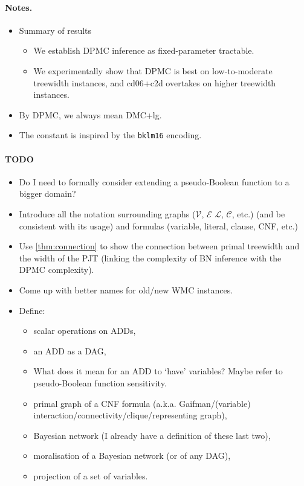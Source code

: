 \documentclass{article}
\theoremstyle{definition}
\theoremstyle{remark}
\begin{document}
\paragraph{Notes.}
\begin{itemize}
\item Summary of results
  \begin{itemize}
  \item We establish \textsc{DPMC} inference as fixed-parameter tractable.
  \item We experimentally show that \textsc{DPMC} is best on low-to-moderate
    treewidth instances, and cd06+c2d overtakes on higher treewidth instances.
  \end{itemize}
\item By \textsc{DPMC}, we always mean DMC+lg.
\item The constant is inspired by the \texttt{bklm16} encoding.
\end{itemize}

\paragraph{TODO}
\begin{itemize}
\item Do I need to formally consider extending a pseudo-Boolean function to a
  bigger domain?
\item Introduce all the notation surrounding graphs ($\mathcal{V}$,
  $\mathcal{E}$ $\mathcal{L}$, $\mathcal{C}$, etc.) (and be consistent with its
  usage) and formulas (variable, literal, clause, CNF, etc.)
\item Use \cref{thm:connection} to show the connection between primal treewidth
  and the width of the PJT (linking the complexity of BN inference with the DPMC
  complexity).
\item Come up with better names for old/new WMC instances.
\item Define:
  \begin{itemize}
  \item scalar operations on ADDs,
  \item an ADD as a DAG,
  \item What does it mean for an ADD to `have' variables? Maybe refer to
    pseudo-Boolean function sensitivity.
  \item primal graph of a CNF formula (a.k.a.
    Gaifman/(variable) interaction/connectivity/clique/representing graph),
  \item Bayesian network (I already have a definition of these last two),
  \item moralisation of a Bayesian network (or of any DAG),
  \item projection of a set of variables.
  \end{itemize}
\end{itemize}
\end{document}
